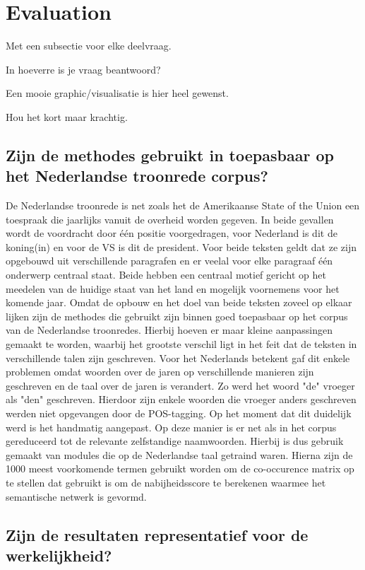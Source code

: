 \section{Evaluation}
\label{sec:eva}

Met een subsectie voor elke deelvraag.

In hoeverre is je vraag beantwoord?

Een mooie graphic/visualisatie is hier heel gewenst.

Hou het kort maar krachtig.

\subsection{Zijn de methodes gebruikt in \cite{state} toepasbaar op het Nederlandse troonrede corpus?}

De Nederlandse troonrede is net zoals het de Amerikaanse State of the Union een toespraak die jaarlijks vanuit de overheid worden gegeven. In beide gevallen wordt de voordracht door één positie voorgedragen, voor Nederland is dit de koning(in) en voor de VS is dit de president. Voor beide teksten geldt dat ze zijn opgebouwd uit verschillende paragrafen en er veelal voor elke paragraaf één onderwerp centraal staat. Beide hebben een centraal motief gericht op het meedelen van de huidige staat van het land en mogelijk voornemens voor het komende jaar. 
Omdat de opbouw en het doel van beide teksten zoveel op elkaar lijken zijn de methodes die gebruikt zijn binnen \cite{state} goed toepasbaar op het corpus van de Nederlandse troonredes. Hierbij hoeven er maar kleine aanpassingen gemaakt te worden, waarbij het grootste verschil ligt in het feit dat de teksten in verschillende talen zijn geschreven. Voor het Nederlands betekent gaf dit enkele problemen omdat woorden over de jaren op verschillende manieren zijn geschreven en de taal over de jaren is verandert. Zo werd het woord "de" vroeger als "den" geschreven. Hierdoor zijn enkele woorden die vroeger anders geschreven werden niet opgevangen door de POS-tagging. Op het moment dat dit duidelijk werd is het handmatig aangepast. Op deze manier is er net als in \cite{state} het corpus gereduceerd tot de relevante zelfstandige naamwoorden. Hierbij is dus gebruik gemaakt van modules die op de Nederlandse taal getraind waren. Hierna zijn de 1000 meest voorkomende termen gebruikt worden om de co-occurence matrix op te stellen dat gebruikt is om de nabijheidsscore te berekenen waarmee het semantische netwerk is gevormd.

\subsection{Zijn de resultaten representatief voor de werkelijkheid?}

